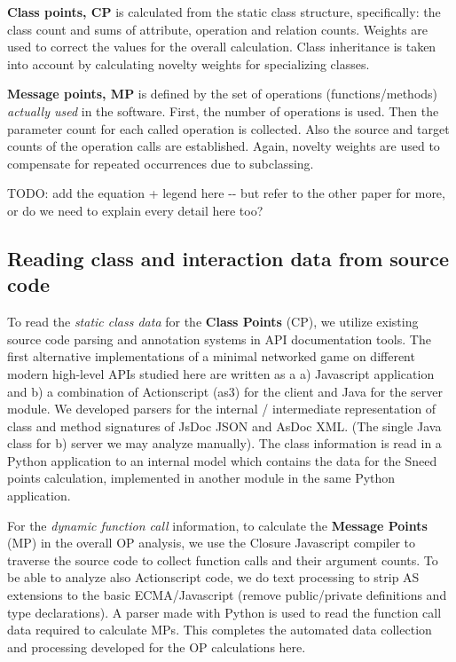 \documentclass[conference]{IEEEtran}
\begin{document}
\textbf{Class points, CP} is calculated from the static class structure,
specifically: the class count and sums of attribute, operation and
relation counts. Weights are used to correct the values for the
overall calculation. Class inheritance is taken into account by
calculating novelty weights for specializing classes.

\textbf{Message points, MP} is defined by the set of operations
(functions/methods) \emph{actually used} in the software. First, the number
of operations is used. Then the parameter count for each called
operation is collected. Also the source and target counts of the
operation calls are established. Again, novelty weights are used to
compensate for repeated occurrences due to subclassing.

TODO: add the equation + legend here -{}- but refer to the other paper
for more, or do we need to explain every detail here too?


\subsection{Reading class and interaction data from source code%
  \label{reading-class-and-interaction-data-from-source-code}%
}

To read the \emph{static class data} for the \textbf{Class Points} (CP), we
utilize existing source code parsing and annotation systems in API
documentation tools. The first alternative implementations of a
minimal networked game on different modern high-level APIs studied
here are written as a a) Javascript application and b) a combination
of Actionscript (as3) for the client and Java for the server
module. We developed parsers for the internal / intermediate
representation of class and method signatures of JsDoc JSON and
AsDoc XML. (The single Java class for b) server we may analyze
manually). The class information is read in a Python application to an
internal model which contains the data for the Sneed points
calculation, implemented in another module in the same Python
application.

For the \emph{dynamic function call} information, to calculate the
\textbf{Message Points} (MP) in the overall OP analysis, we use the Closure
Javascript compiler to traverse the source code to collect function
calls and their argument counts. To be able to analyze also
Actionscript code, we do text processing to strip AS extensions to the
basic ECMA/Javascript (remove public/private definitions and type
declarations). A parser made with Python is used to read the function
call data required to calculate MPs. This completes the automated data
collection and processing developed for the OP calculations here.
\end{document}
